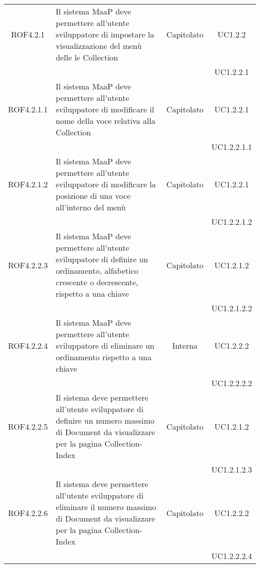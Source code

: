 \begin{longtable}{|c|p{6cm}|c|c|}
\midrule
ROF4.2.1
& Il sistema MaaP deve permettere all'utente sviluppatore di impostare la visualizzazione del menù delle le Collection
& Capitolato
& UC1.2.2\\
& & & UC1.2.2.1
\\
\midrule
ROF4.2.1.1
& Il sistema MaaP deve permettere all'utente sviluppatore di modificare il nome della voce relativa alla Collection
& Capitolato
& UC1.2.2.1\\
& & & UC1.2.2.1.1
\\
\midrule
ROF4.2.1.2
& Il sistema MaaP deve permettere all'utente sviluppatore di modificare la posizione di una voce all'interno del menù
& Capitolato
& UC1.2.2.1\\
& & & UC1.2.2.1.2
\\

\midrule
ROF4.2.2.3
& Il sistema MaaP deve permettere all'utente sviluppatore di definire un ordinamento, alfabetico crescente o decrescente, rispetto a una chiave
& Capitolato
& UC1.2.1.2\\
& & & UC1.2.1.2.2
\\
\midrule
ROF4.2.2.4
& Il sistema MaaP deve permettere all'utente sviluppatore di eliminare un ordinamento rispetto a una chiave
& Interna
& UC1.2.2.2\\
& & & UC1.2.2.2.2
\\
\midrule
ROF4.2.2.5
& Il sistema deve permettere all'utente sviluppatore di  definire un numero massimo di Document da visualizzare per la pagina Collection-Index
& Capitolato
& UC1.2.1.2\\
& & & UC1.2.1.2.3
\\
\midrule
ROF4.2.2.6
& Il sistema deve permettere all'utente sviluppatore di  eliminare il numero massimo di Document da visualizzare per la pagina Collection-Index
& Capitolato
& UC1.2.2.2\\
& & & UC1.2.2.2.4
\\
\end{longtable}
